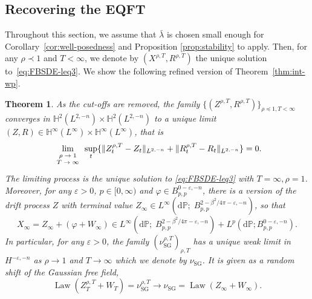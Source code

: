 \documentclass[11pt, a4paper]{scrartcl}
\numberwithin{equation}{section}
\theoremstyle{plain}
\newtheorem{theorem}[foo]{Theorem}
\theoremstyle{remark}
\newcommand{\mathd}{\mathrm{d}}
\newcommand{\tmop}[1]{\ensuremath{\operatorname{#1}}}
\newcommand{\tmscript}[1]{\text{\scriptsize{$#1$}}}
\begin{document}
\subsection{Recovering the EQFT}

Throughout this section, we assume that $\bar{\lambda}$ is chosen small enough for
Corollary~\ref{cor:well-posedness} and Proposition \ref{prop:stability} to
apply. Then, for any $\rho \prec 1$ and $T < \infty$, we denote by $(X^{\rho, T},
R^{\rho, T})$ the unique solution to~\eqref{eq:FBSDE-leq3}. We show the
following refined version of Theorem~\ref{thm:int-wp}.

\begin{theorem}
  \label{thm:T,rho-convergence}As the cut-offs are removed, the family $\{
  (Z^{\rho, T}, R^{\rho, T}) \}_{\rho \preceq  1, T < \infty}$ converges in
  $\mathbb{H}^2 (L^{2, - n}) \times \mathbb{H}^2 (L^{2, - n})$ to a unique
  limit $(Z, R) \in \mathbb{H}^{\infty} (L^{\infty}) \times
  \mathbb{H}^{\infty} (L^{\infty})$, that is
  \[ \lim_{\tmscript{\begin{array}{c}
       \rho \rightarrow 1\\
       T \rightarrow \infty
     \end{array}}} \sup_t \{ \| Z^{\rho, T}_t - Z_t \|_{L^{2, - n}} + \|
     R^{\rho, T}_t - R_t \|_{L^{2, - n}} \} = 0. \]
  The limiting process is the unique solution to \eqref{eq:FBSDE-leq3} with $T=\infty, \rho=1$.
  Moreover, for any $\varepsilon > 0$, $p \in [0, \infty)$ and $\varphi \in
  B^{0 - \varepsilon, - n}_{p, p}$, there is a version of the drift process
  $Z$ with terminal value $Z_{\infty} \in L^{\infty} \left( \mathd \mathbb{P} ; \;
  B_{p, p}^{2 - \beta^2 / 4 \pi - \varepsilon, - n} \right)$, so that
  \begin{equation}
    X_{\infty} = Z_{\infty} + (\varphi + W_{\infty}) \in L^{\infty} \left(
    \mathd \mathbb{P} ; \; B_{p, p}^{2 - \beta^2 / 4 \pi - \varepsilon, - n} \right) +
    L^p (\mathd \mathbb{P} ; B_{p, p}^{0 - \varepsilon, - n}) .
    \label{eq:phi-infty-regularity}
  \end{equation}
  In particular, for any $\varepsilon > 0$, the family
  $(\nu_{\tmop{SG}}^{\rho, T})_{\rho, T}$ has a unique weak limit in $H^{-
  \varepsilon, - n}$ as $\rho \rightarrow 1$ and $T \rightarrow \infty$ which
  we denote by $\nu_{\tmop{SG}}$. It is given as a random shift of the
  Gaussian free field,
  \[ \tmop{Law} (Z_T^{\rho, T} + W_T) = \nu^{\rho, T}_{\tmop{SG}} \longrightarrow
     \nu_{\tmop{SG}} = \tmop{Law} (Z_{\infty} + W_{\infty}) . \]
\end{theorem}
\end{document}
